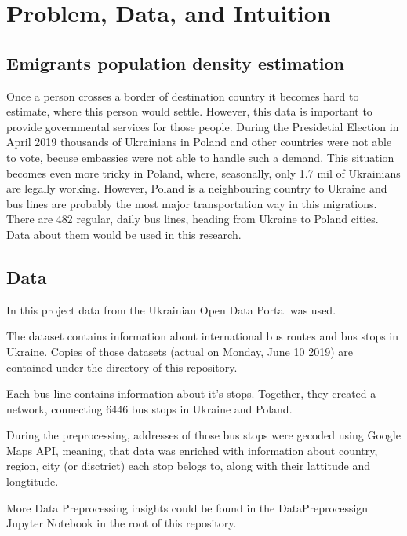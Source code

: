 \section{Problem, Data, and Intuition}

\subsection{Emigrants population density estimation}

Once a person crosses a border of destination country it becomes hard to estimate, where this person would settle. However, this data is important to provide governmental services for those people. During the Presidetial Election in April 2019 thousands of Ukrainians in Poland and other countries were not able to vote, becuse embassies were not able to handle such a demand.
\newline
This situation becomes even more tricky in Poland, where, seasonally, only 1.7 mil of Ukrainians are legally working.
\newline
However, Poland is a neighbouring country to Ukraine and bus lines are probably the most major transportation way in this migrations. There are 482 regular, daily bus lines, heading from Ukraine to Poland cities. Data about them would be used in this research.

\subsection{Data}

In this project data from the Ukrainian Open Data Portal was used.

The dataset contains information about international bus routes and bus stops in Ukraine. Copies of those datasets (actual on Monday, June 10 2019) are contained under the  directory of this repository.

Each bus line contains information about it's stops. Together, they created a network, connecting 6446 bus stops in Ukraine and Poland.

During the preprocessing, addresses of those bus stops were gecoded using Google Maps API, meaning, that data was enriched with information about country, region, city (or disctrict) each stop belogs to, along with their lattitude and longtitude.

More Data Preprocessing insights could be found in the DataPreprocessign Jupyter Notebook in the root of this repository.

